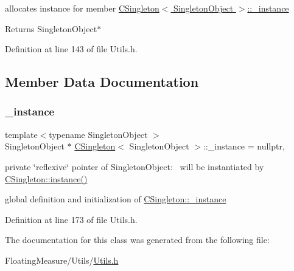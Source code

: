 allocates instance for member \hyperlink{classCSingleton_a690e0816be5d469e60d074cf8c5d139c}{C\+Singleton$<$ Singleton\+Object $>$\+::\+\_\+instance} 

\begin{DoxyReturn}{Returns}
Singleton\+Object$\ast$ 
\end{DoxyReturn}


Definition at line 143 of file Utils.\+h.



\subsection{Member Data Documentation}
\mbox{\label{classCSingleton_a690e0816be5d469e60d074cf8c5d139c}} 
\subsubsection{\texorpdfstring{\+\_\+instance}{\_instance}}
{\footnotesize\ttfamily template$<$typename Singleton\+Object $>$ \\
Singleton\+Object $\ast$ \hyperlink{classCSingleton}{C\+Singleton}$<$ Singleton\+Object $>$\+::\+\_\+instance = nullptr\hspace{0.3cm}{\ttfamily [static]}, {\ttfamily [private]}}



private \char`\"{}reflexive\char`\"{} pointer of Singleton\+Object\+:~\newline
 will be instantiated by \hyperlink{classCSingleton_a58f5ac3aaaea8079a373350594726bdf}{C\+Singleton\+::instance()} 

global definition and initialization of \hyperlink{classCSingleton_a690e0816be5d469e60d074cf8c5d139c}{C\+Singleton\+::\+\_\+instance} 

Definition at line 173 of file Utils.\+h.



The documentation for this class was generated from the following file\+:\begin{DoxyCompactItemize}
\item 
Floating\+Measure/\+Utils/\hyperlink{Utils_8h}{Utils.\+h}\end{DoxyCompactItemize}
